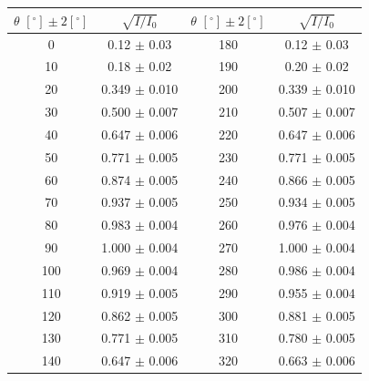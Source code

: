 \documentclass[a4paper]{article}
\begin{document}
\begin{table}[H]
	\centering
	\begin{tabular}{cc||cc}
		\hline
		$\theta\,\,[^\circ] \pm 2[^\circ]$ & $\sqrt{I/I_0}$       & $\theta\,\,[^\circ] \pm 2[^\circ]$ & $\sqrt{I/I_0}$      \\
		\hline
		0                                  & 0.12     $\pm$ 0.03  & 180                                & 0.12    $\pm$ 0.03  \\
		10                                 & 0.18     $\pm$ 0.02  & 190                                & 0.20    $\pm$ 0.02  \\
		20                                 & 0.349    $\pm$ 0.010 & 200                                & 0.339   $\pm$ 0.010 \\
		30                                 & 0.500    $\pm$ 0.007 & 210                                & 0.507   $\pm$ 0.007 \\
		40                                 & 0.647    $\pm$ 0.006 & 220                                & 0.647   $\pm$ 0.006 \\
		50                                 & 0.771    $\pm$ 0.005 & 230                                & 0.771   $\pm$ 0.005 \\
		60                                 & 0.874    $\pm$ 0.005 & 240                                & 0.866   $\pm$ 0.005 \\
		70                                 & 0.937    $\pm$ 0.005 & 250                                & 0.934   $\pm$ 0.005 \\
		80                                 & 0.983    $\pm$ 0.004 & 260                                & 0.976   $\pm$ 0.004 \\
		90                                 & 1.000    $\pm$ 0.004 & 270                                & 1.000   $\pm$ 0.004 \\
		100                                & 0.969    $\pm$ 0.004 & 280                                & 0.986   $\pm$ 0.004 \\
		110                                & 0.919    $\pm$ 0.005 & 290                                & 0.955   $\pm$ 0.004 \\
		120                                & 0.862    $\pm$ 0.005 & 300                                & 0.881   $\pm$ 0.005 \\
		130                                & 0.771    $\pm$ 0.005 & 310                                & 0.780   $\pm$ 0.005 \\
		140                                & 0.647    $\pm$ 0.006 & 320                                & 0.663   $\pm$ 0.006 \\

\end{tabular}
\end{table}
\end{document}
